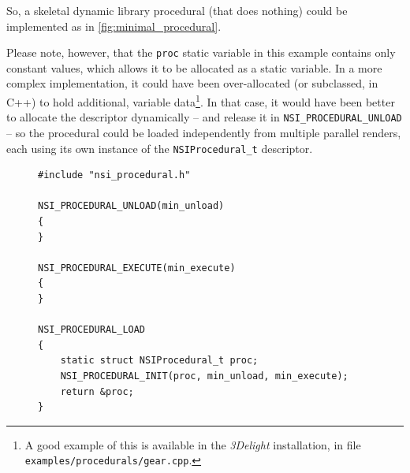 \documentclass[oneside,ebook]{memoir}
\begin{document}
So, a skeletal dynamic library procedural (that does nothing) could be implemented as in \autoref{fig:minimal_procedural}.

Please note, however, that the \lstinline|proc| static variable in this example contains only constant values, which allows it to be allocated as a static variable.
In a more complex implementation, it could have been over-allocated (or subclassed, in C++) to hold additional, variable data\footnote{A good example of this is available in the \textit{3Delight} installation, in file \lstinline|examples/procedurals/gear.cpp|.}.
In that case, it would have been better to allocate the descriptor dynamically -- and release it in \lstinline|NSI_PROCEDURAL_UNLOAD| -- so the procedural could be loaded independently from multiple parallel renders, each using its own instance of the \lstinline|NSIProcedural_t| descriptor.

\begin{figure}
\footnotesize
\begin{lstlisting}[frame=top,frame=bottom,caption={A minimal dynamic library procedural},style=CAPI,label={fig:minimal_procedural}]
#include "nsi_procedural.h"

NSI_PROCEDURAL_UNLOAD(min_unload)
{
}

NSI_PROCEDURAL_EXECUTE(min_execute)
{
}

NSI_PROCEDURAL_LOAD
{
	static struct NSIProcedural_t proc;
	NSI_PROCEDURAL_INIT(proc, min_unload, min_execute);
	return &proc;
}
\end{lstlisting}
\end{figure}
\end{document}
